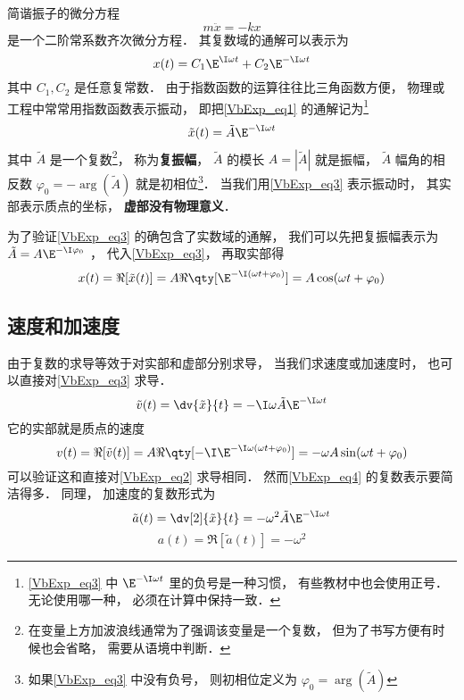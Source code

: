 

简谐振子的微分方程
\begin{equation}\label{VbExp_eq1}
m\ddot x =  - kx
\end{equation}
是一个二阶常系数齐次微分方程． 其复数域的通解可以表示为
\begin{equation}
x(t) = C_1 \E^{\I \omega t} + C_2 \E^{-\I \omega t}
\end{equation}
其中 $C_1, C_2$ 是任意复常数． 由于指数函数的运算往往比三角函数方便， 物理或工程中常常用指数函数表示振动， 即把\autoref{VbExp_eq1} 的通解记为\footnote{\autoref{VbExp_eq3} 中 $\E^{-\I \omega t}$ 里的负号是一种习惯， 有些教材中也会使用正号． 无论使用哪一种， 必须在计算中保持一致．}
\begin{equation}\label{VbExp_eq3}
\tilde x(t) = \tilde A \E^{-\I \omega t}
\end{equation}
其中 $\tilde A$ 是一个复数\footnote{在变量上方加波浪线通常为了强调该变量是一个复数， 但为了书写方便有时候也会省略， 需要从语境中判断．}， 称为\textbf{复振幅}， $\tilde A$ 的模长 $A = |\tilde A|$ 就是振幅， $\tilde A$ 幅角的相反数 $\varphi_0 = -\arg(\tilde A)$ 就是初相位\footnote{如果\autoref{VbExp_eq3} 中没有负号， 则初相位定义为 $\varphi_0 = \arg(\tilde A)$}． 当我们用\autoref{VbExp_eq3} 表示振动时， 其实部表示质点的坐标， \textbf{虚部没有物理意义}．

为了验证\autoref{VbExp_eq3} 的确包含了实数域的通解， 我们可以先把复振幅表示为 $\tilde A = A\E^{-\I \varphi_0}$%
， 代入\autoref{VbExp_eq3}， 再取实部得
\begin{equation}\label{VbExp_eq2}
x(t) = \Re[\tilde x(t)] = A\Re \qty[\E^{-\I (\omega t + \varphi_0)}] = A \cos(\omega t + \varphi_0)
\end{equation}

\subsection{速度和加速度}
由于复数的求导等效于对实部和虚部分别求导， 当我们求速度或加速度时， 也可以直接对\autoref{VbExp_eq3} 求导．
\begin{equation}\label{VbExp_eq4}
\tilde v(t) = \dv{\tilde x}{t} = -\I \omega \tilde A \E^{-\I \omega t}
\end{equation}
它的实部就是质点的速度
\begin{equation}
v(t) = \Re[\tilde v(t)] = A\Re \qty[-\I\E^{-\I\omega (\omega t + \varphi_0)}] = -\omega A \sin(\omega t + \varphi_0)
\end{equation}
可以验证这和直接对\autoref{VbExp_eq2} 求导相同． 然而\autoref{VbExp_eq4} 的复数表示要简洁得多． 同理， 加速度的复数形式为
\begin{equation}
\tilde a(t) = \dv[2]{\tilde x}{t} = -\omega^2 \tilde A \E^{-\I \omega t}
\end{equation}
\begin{equation}
a(t) = \Re[\tilde a(t)] = -\omega^2
\end{equation}


